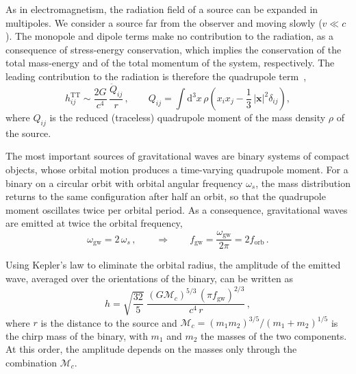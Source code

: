 As in electromagnetism, the radiation field of a source can be expanded in
multipoles. We consider a source far from the observer and moving slowly
($v \ll c$). The monopole and dipole terms make no contribution to the radiation, as a
consequence of stress-energy conservation, which implies the conservation of
the total mass-energy and of the total momentum of the system, respectively. The leading contribution to the
radiation is therefore the quadrupole term~\cite{Maggiore2008},
\begin{equation}
    h_{ij}^{\mathrm{TT}} \sim \frac{2G}{c^4}\,\frac{\ddot{Q}_{ij}}{r}\, ,
    \qquad
    Q_{ij} = \int \mathrm{d}^3x\, \rho \left( x_i x_j - \frac{1}{3}\, |\mathbf{x}|^2 \delta_{ij} \right) ,
    \label{eq:quadrupolo}
\end{equation}
where $Q_{ij}$ is the reduced (traceless) quadrupole moment of the mass density
$\rho$ of the source.

The most important sources of gravitational waves are binary systems of compact
objects, whose orbital motion produces a time-varying quadrupole moment.
For a binary on a circular orbit with orbital angular frequency
$\omega_s$, the mass distribution returns to the same configuration after half
an orbit, so that the quadrupole moment oscillates twice per orbital period.
As a consequence, gravitational waves are emitted at twice the orbital
frequency,
\begin{equation}
    \omega_{\mathrm{gw}} = 2\,\omega_s\, , \qquad \Rightarrow \qquad
    f_{\mathrm{gw}} = \frac{\omega_{\mathrm{gw}}}{2\pi} = 2 f_{\mathrm{orb}}\, .
    \label{eq:fgw}
\end{equation}

Using Kepler's law to eliminate the orbital radius, the amplitude of the
emitted wave, averaged over the orientations of the binary, can be written as~\cite{Taylor2021}
\begin{equation}
    h = \sqrt{\frac{32}{5}}\;
    \frac{(G\mathcal{M}_c)^{5/3}\,(\pi f_{\mathrm{gw}})^{2/3}}{c^4\, r}\, ,
    \label{eq:ampiezza_binaria}
\end{equation}
where $r$ is the distance to the source and
$\mathcal{M}_c = (m_1 m_2)^{3/5}/(m_1 + m_2)^{1/5}$ is the chirp mass of the binary, with $m_1$ and $m_2$ the masses of the two
components. At this order, the amplitude depends on the masses only through
the combination $\mathcal{M}_c$.

